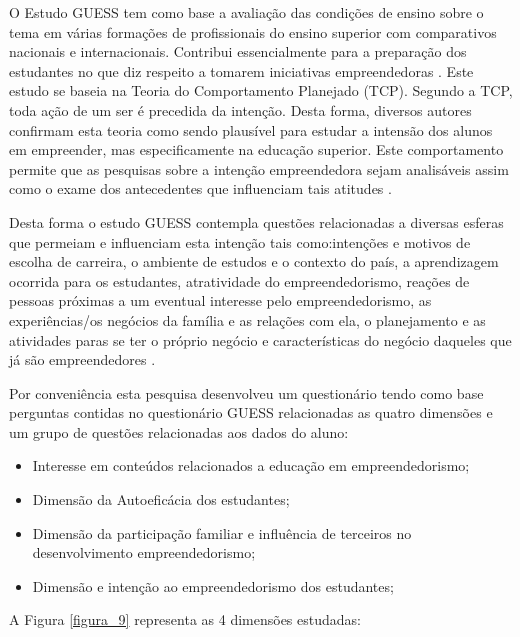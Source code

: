 O Estudo GUESS tem como base a avaliação das condições de ensino sobre o tema em várias formações de profissionais do ensino superior com comparativos nacionais e internacionais. Contribui essencialmente para a preparação dos estudantes no
que diz respeito a tomarem iniciativas empreendedoras \cite{meirelles_estudo_2013}. Este estudo se baseia na Teoria do Comportamento Planejado (TCP). Segundo a TCP, toda ação de um ser é precedida da intenção. Desta forma, diversos autores confirmam esta teoria como sendo plausível para  estudar a intensão dos alunos em empreender, mas especificamente na educação superior. Este comportamento permite que as pesquisas sobre a intenção empreendedora sejam analisáveis assim como o exame dos antecedentes que influenciam tais atitudes \cite{sieger_global_2018}.  

Desta forma o estudo GUESS contempla questões relacionadas a diversas esferas que permeiam e influenciam esta intenção tais como:intenções e motivos de escolha de carreira, o ambiente de estudos e o contexto do país, a aprendizagem ocorrida para os estudantes, atratividade do empreendedorismo, reações de pessoas próximas a um eventual interesse pelo empreendedorismo, as experiências/os negócios da família e as
relações com ela, o planejamento e as atividades paras se ter o próprio negócio e características do negócio daqueles que já são empreendedores \cite{sieger_global_2018}. 

Por conveniência esta pesquisa desenvolveu um questionário tendo como base perguntas contidas no questionário GUESS relacionadas as quatro dimensões e um grupo de questões relacionadas aos dados do aluno: 


\begin{itemize}
\item {Interesse em conteúdos relacionados a educação em empreendedorismo;}
\item {Dimensão da Autoeficácia dos estudantes;}
\item {Dimensão da participação familiar e influência de terceiros no desenvolvimento empreendedorismo;}
\item {Dimensão e intenção  ao empreendedorismo dos estudantes;}
\end{itemize}

A Figura \ref{figura_9} representa as 4 dimensões estudadas:

